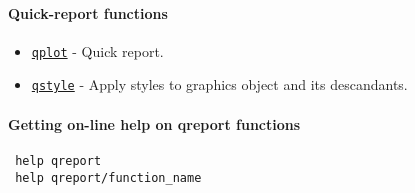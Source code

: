 

	\paragraph{Quick-report functions}
 
 \begin{itemize}
 \item
   \href{qreport/qplot}{\texttt{qplot}} - Quick report.
 \item
   \href{qreport/qstyle}{\texttt{qstyle}} - Apply styles to graphics
   object and its descandants.
 \end{itemize}
 
 \paragraph{Getting on-line help on qreport functions}
 
 \begin{verbatim}
 help qreport
 help qreport/function_name
 \end{verbatim}




